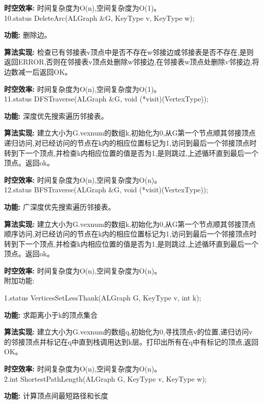 \documentclass[supercite]{Experimental_Report}
\theoremstyle{definition}
\begin{document}
\textbf{时空效率: }时间复杂度为O(n),空间复杂度为O(1)。\\

10.status DeleteArc(ALGraph \&G, KeyType v, KeyType w);

\textbf{功能: }删除边。

\textbf{算法实现: }检查已有邻接表v顶点中是否不存在w邻接边或邻接表是否不存在,是则返回ERROR,否则在邻接表v顶点处删除w邻接边,在邻接表w顶点处删除v邻接边,将边数减一后返回OK。

\textbf{时空效率: }时间复杂度为O(n),空间复杂度为O(1)。\\

11.status DFSTraverse(ALGraph \&G, void (*visit)(VertexType));

\textbf{功能: }深度优先搜索遍历邻接表。

\textbf{算法实现: }建立大小为G.vexnum的数组k,初始化为0,从G第一个节点顺其邻接顶点递归访问,对已经访问的节点在k内的相应位置标记为1,访问到最后一个邻接顶点时转到下一个顶点,并检查k内相应位置的值是否为1,是则跳过,上述循环直到最后一个顶点。返回ok。

\textbf{时空效率: }时间复杂度为O(n),空间复杂度为O(n)。\\

12.status BFSTraverse(ALGraph \&G, void (*visit)(VertexType));

\textbf{功能: }广深度优先搜索遍历邻接表。

\textbf{算法实现: }建立大小为G.vexnum的数组k,初始化为0,从G第一个节点顺其邻接顶点顺序访问,对已经访问的节点在k内的相应位置标记为1,访问到最后一个邻接顶点时转到下一个顶点,并检查k内相应位置的值是否为1,是则跳过,上述循环直到最后一个顶点。返回ok。

\textbf{时空效率: }时间复杂度为O(n),空间复杂度为O(n)。\\

附加功能:

1.status VerticesSetLessThank(ALGraph G, KeyType v, int k);

\textbf{功能: }求距离小于k的顶点集合

\textbf{算法实现: }建立大小为G.vexnum的数组q,初始化为0,寻找顶点v的位置,递归访问v的邻接顶点并标记在q中直到栈调用达到k层。打印出所有在q中有标记的顶点,返回OK。

\textbf{时空效率: }时间复杂度为O(n),空间复杂度为O(n)。\\

2.int ShortestPathLength(ALGraph G, KeyType v, KeyType w);

\textbf{功能: }计算顶点间最短路径和长度
\end{document}
